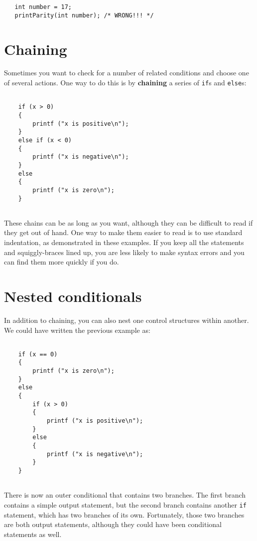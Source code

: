 \begin{verbatim}
   int number = 17;
   printParity(int number); /* WRONG!!! */
\end{verbatim}

\section {Chaining}

Sometimes you want to check for a number of related conditions
and choose one of several actions.  One way to do this is by
{\bf chaining} a series of {\tt if}s and {\tt else}s:

\begin{verbatim}

    if (x > 0) 
    {
        printf ("x is positive\n");
    } 
    else if (x < 0) 
    {
        printf ("x is negative\n");
    } 
    else 
    {
        printf ("x is zero\n");
    }
    
\end{verbatim}
%
These chains can be as long as you want, although they can
be difficult to read if they get out of hand.  One way to
make them easier to read is to use standard indentation,
as demonstrated in these examples.  If you keep all the
statements and squiggly-braces lined up, you are less
likely to make syntax errors and you can find them more
quickly if you do.

\section{Nested conditionals}

In addition to chaining, you can also nest one control structures
within another.  We could have written the previous example
as:

\begin{verbatim}

    if (x == 0) 
    {
        printf ("x is zero\n");
    } 
    else 
    {
        if (x > 0) 
        {
            printf ("x is positive\n");
        }
        else 
        {
            printf ("x is negative\n");
        }
    }
    
\end{verbatim}
%
There is now an outer conditional that contains two branches.  The
first branch contains a simple output statement, but the second
branch contains another {\tt if} statement, which has two branches
of its own.  Fortunately, those two branches are both output
statements, although they could have been conditional statements as
well.

